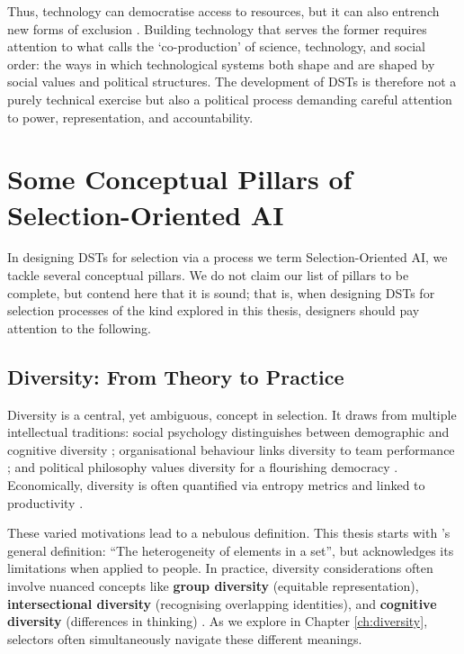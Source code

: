 Thus, technology can democratise access to resources, but it can also entrench new forms of exclusion \cite{rheingold2002smart, eubanks2018automating}. Building technology that serves the former requires attention to what \textcite{jasanoff2004states} calls the `co-production' of science, technology, and social order: the ways in which technological systems both shape and are shaped by social values and political structures. The development of DSTs is therefore not a purely technical exercise but also a political process demanding careful attention to power, representation, and accountability.

\section{Some Conceptual Pillars of Selection-Oriented AI}\label{sec:context_pillars}
In designing DSTs for selection via a process we term Selection-Oriented AI, we tackle several conceptual pillars. We do not claim our list of pillars to be complete, but contend here that it is sound; that is, when designing DSTs for selection processes of the kind explored in this thesis, designers should pay attention to the following.

\subsection{Diversity: From Theory to Practice}\label{ssec:context_diversity}
Diversity is a central, yet ambiguous, concept in selection. It draws from multiple intellectual traditions: social psychology distinguishes between demographic and cognitive diversity \cite{page_diversity_2010}; organisational behaviour links diversity to team performance \cite{page_diversity_2017}; and political philosophy values diversity for a flourishing democracy \cite{mill1859liberty, young1990justice}. Economically, diversity is often quantified via entropy metrics and linked to productivity \cite{noray2023systemic}.

These varied motivations lead to a nebulous definition. This thesis starts with \textcite{page_diversity_2010}'s general definition: ``The heterogeneity of elements in a set'', but acknowledges its limitations when applied to people. In practice, diversity considerations often involve nuanced concepts like \textbf{group diversity} (equitable representation), \textbf{intersectional diversity} (recognising overlapping identities), and \textbf{cognitive diversity} (differences in thinking) \cite{Mitchell_Diversity_2020, Crenshaw_Demarginalizing_1989, Hong_Page_2004_Diversity}. As we explore in Chapter \ref{ch:diversity}, selectors often simultaneously navigate these different meanings.

